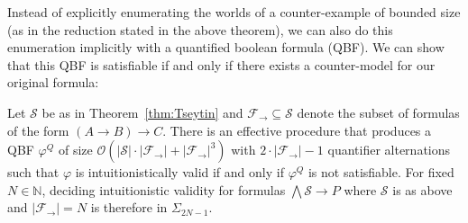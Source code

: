 \documentclass[a4paper,UKenglish,cleveref, autoref, thm-restate]{lipics-v2021}
\begin{document}
Instead of explicitly enumerating the worlds of a counter-example of bounded size (as in the reduction stated in the above theorem), we can also do this enumeration implicitly with a quantified boolean formula (QBF).
We can show that this QBF is satisfiable if and only if there exists a counter-model for our original formula:

\begin{theorem}
	Let $\mathcal S$ be as in Theorem~\ref{thm:Tseytin} and $\mathcal F_\to\subseteq\mathcal S$ denote the subset of formulas of the form $(A\to B)\to C$. There is an effective procedure that produces a QBF $\varphi^Q$ of size $\mathcal O(|\mathcal S|\cdot|\mathcal F_\to| + |\mathcal F_\to|^3)$ with $2\cdot |\mathcal F_\to|-1$ quantifier alternations such that $\varphi$ is intuitionistically valid if and only if $\varphi^Q$ is not satisfiable. For fixed $N\in\mathbb N$, deciding intuitionistic validity for formulas $\bigwedge \mathcal S\to P$ where $\mathcal S$ is as above and $|\mathcal F_\to| = N$ is therefore in $\Sigma_{2N-1}$.
\end{theorem}

\end{document}
